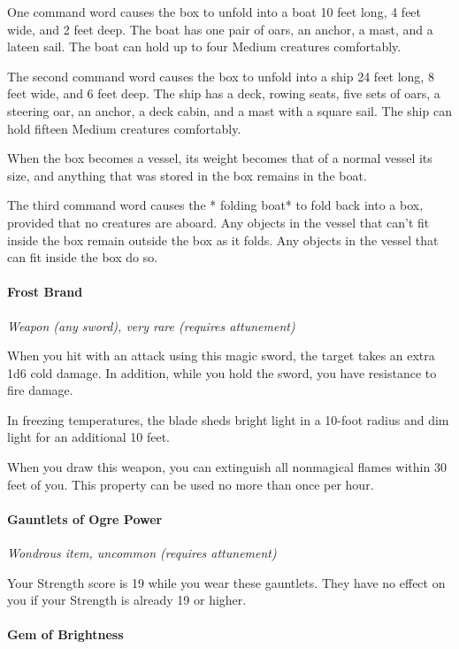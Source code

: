 \documentclass[
]{article}
\begin{document}
One command word causes the box to unfold into a boat 10 feet long, 4
feet wide, and 2 feet deep. The boat has one pair of oars, an anchor, a
mast, and a lateen sail. The boat can hold up to four Medium creatures
comfortably.

The second command word causes the box to unfold into a ship 24 feet
long, 8 feet wide, and 6 feet deep. The ship has a deck, rowing seats,
five sets of oars, a steering oar, an anchor, a deck cabin, and a mast
with a square sail. The ship can hold fifteen Medium creatures
comfortably.

When the box becomes a vessel, its weight becomes that of a normal
vessel its size, and anything that was stored in the box remains in the
boat.

The third command word causes the * folding boat* to fold back into a
box, provided that no creatures are aboard. Any objects in the vessel
that can't fit inside the box remain outside the box as it folds. Any
objects in the vessel that can fit inside the box do so.

\hypertarget{frost-brand}{%
\paragraph{Frost Brand}\label{frost-brand}}

\emph{Weapon (any sword), very rare (requires attunement)}

When you hit with an attack using this magic sword, the target takes an
extra 1d6 cold damage. In addition, while you hold the sword, you have
resistance to fire damage.

In freezing temperatures, the blade sheds bright light in a 10-foot
radius and dim light for an additional 10 feet.

When you draw this weapon, you can extinguish all nonmagical flames
within 30 feet of you. This property can be used no more than once per
hour.

\hypertarget{gauntlets-of-ogre-power}{%
\paragraph{Gauntlets of Ogre Power}\label{gauntlets-of-ogre-power}}

\emph{Wondrous item, uncommon (requires attunement)}

Your Strength score is 19 while you wear these gauntlets. They have no
effect on you if your Strength is already 19 or higher.

\hypertarget{gem-of-brightness}{%
\paragraph{Gem of Brightness}\label{gem-of-brightness}}
\end{document}
